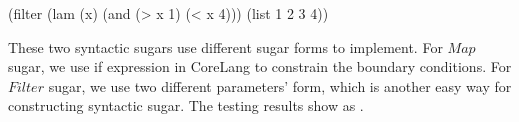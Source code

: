 \begin{Codes}
    (filter (lam (x) (and (> x 1) (< x 4))) (list 1 2 3 4))
\end{Codes}

These two syntactic sugars use different sugar forms to implement. For $Map$ sugar, we use if expression in CoreLang to constrain the boundary conditions. For $Filter$ sugar, we use two different parameters' form, which is another easy way for constructing syntactic sugar. The testing results show as .




